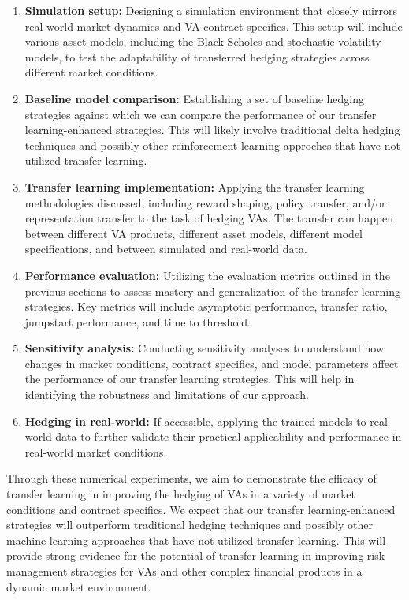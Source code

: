 \begin{enumerate}
    \item \textbf{Simulation setup:} Designing a simulation environment that closely mirrors real-world market dynamics and VA contract specifics. 
    This setup will include various asset models, including the Black-Scholes and stochastic volatility models, to test the adaptability of transferred hedging strategies across different market conditions.
    \item \textbf{Baseline model comparison:} Establishing a set of baseline hedging strategies against which we can compare the performance of our transfer learning-enhanced strategies. 
    This will likely involve traditional delta hedging techniques and possibly other reinforcement learning approches that have not utilized transfer learning.
    \item \textbf{Transfer learning implementation:} Applying the transfer learning methodologies discussed, including reward shaping, policy transfer, and/or representation transfer to the task of hedging VAs. 
    The transfer can happen between different VA products, different asset models, different model specifications, and between simulated and real-world data.
    \item \textbf{Performance evaluation:} Utilizing the evaluation metrics outlined in the previous sections to assess mastery and generalization of the transfer learning strategies. 
    Key metrics will include asymptotic performance, transfer ratio, jumpstart performance, and time to threshold.
    \item \textbf{Sensitivity analysis:} Conducting sensitivity analyses to understand how changes in market conditions, contract specifics, and model parameters affect the performance of our transfer learning strategies. This will help in identifying the robustness and limitations of our approach.
    \item \textbf{Hedging in real-world:} If accessible, applying the trained models to real-world data to further validate their practical applicability and performance in real-world market conditions.
\end{enumerate}

Through these numerical experiments, we aim to demonstrate the efficacy of transfer learning in improving the hedging of VAs in a variety of market conditions and contract specifics. 
We expect that our transfer learning-enhanced strategies will outperform traditional hedging techniques and possibly other machine learning approaches that have not utilized transfer learning. 
This will provide strong evidence for the potential of transfer learning in improving risk management strategies for VAs and other complex financial products in a dynamic market environment.

